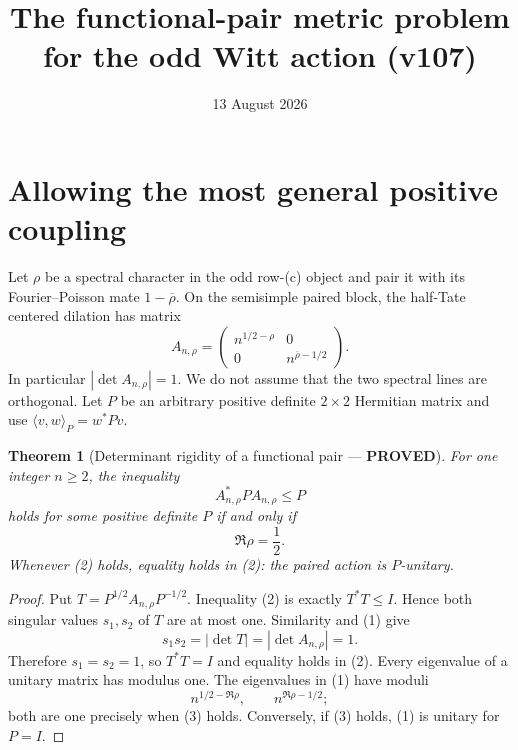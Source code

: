 \documentclass[11pt]{article}
\title{The functional-pair metric problem for the odd Witt action (v107)}
\date{13 August 2026}
\newcommand{\PROVED}{\textcolor{green!40!black}{\textbf{PROVED}}}
\newtheorem{theorem}{Theorem}
\begin{document}
\maketitle

\section{Allowing the most general positive coupling}

Let $\rho$ be a spectral character in the odd row-(c) object and pair it
with its Fourier--Poisson mate $1-\overline\rho$.  On the semisimple paired
block, the half-Tate centered dilation has matrix
\begin{equation}
 A_{n,\rho}=
 \begin{pmatrix}
 n^{1/2-\rho}&0\\
 0&n^{\overline\rho-1/2}
 \end{pmatrix}.                                                \tag{1}
\end{equation}
In particular $|\det A_{n,\rho}|=1$.  We do not assume that the two
spectral lines are orthogonal.  Let $P$ be an arbitrary positive definite
$2\times2$ Hermitian matrix and use
$\langle v,w\rangle_P=w^*Pv$.

\begin{theorem}[Determinant rigidity of a functional pair --- \PROVED]
For one integer $n\ge2$, the inequality
\begin{equation}
                       A_{n,\rho}^*PA_{n,\rho}\le P            \tag{2}
\end{equation}
holds for some positive definite $P$ if and only if
\begin{equation}
                         \Re\rho=\frac12.                       \tag{3}
\end{equation}
Whenever (2) holds, equality holds in (2): the paired action is $P$-unitary.
\end{theorem}

\begin{proof}
Put $T=P^{1/2}A_{n,\rho}P^{-1/2}$.  Inequality (2) is exactly
$T^*T\le I$.  Hence both singular values $s_1,s_2$ of $T$ are at most one.
Similarity and (1) give
\[
 s_1s_2=|\det T|=|\det A_{n,\rho}|=1.
\]
Therefore $s_1=s_2=1$, so $T^*T=I$ and equality holds in (2).  Every
eigenvalue of a unitary matrix has modulus one.  The eigenvalues in (1)
have moduli
\[
 n^{1/2-\Re\rho},\qquad n^{\Re\rho-1/2};
\]
both are one precisely when (3) holds.  Conversely, if (3) holds, (1) is
unitary for $P=I$.
\end{proof}
\end{document}
